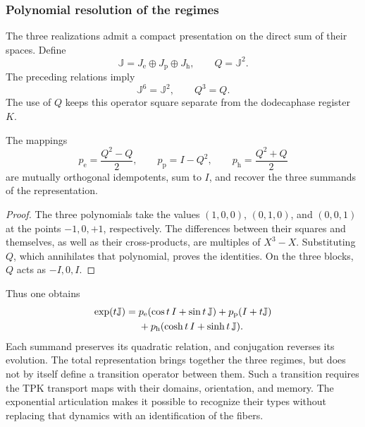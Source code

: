 \subsubsection{Polynomial resolution of the regimes}

The three realizations admit a compact presentation on the direct
sum of their spaces. Define
\[
 \mathbb J=J_{\mathrm e}\oplus J_{\mathrm p}\oplus J_{\mathrm h},
 \qquad Q=\mathbb J^2.
\]
The preceding relations imply
\[
 \mathbb J^6=\mathbb J^2,\qquad Q^3=Q.
\]
The use of \(Q\) keeps this operator square separate from the
dodecaphase register \(K\).

\begin{proposition}
\label{euler-trit-proyectores}
The mappings
\[
 p_{\mathrm e}=\frac{Q^2-Q}{2},\qquad
 p_{\mathrm p}=I-Q^2,\qquad
 p_{\mathrm h}=\frac{Q^2+Q}{2}
\]
are mutually orthogonal idempotents, sum to \(I\), and recover the three
summands of the representation.
\end{proposition}
\begin{proof}
The three polynomials take the values \((1,0,0)\), \((0,1,0)\), and
\((0,0,1)\) at the points \(-1,0,+1\), respectively. The differences
between their squares and themselves, as well as their cross-products, are
multiples of \(X^3-X\). Substituting \(Q\), which annihilates that polynomial, proves
the identities. On the three blocks, \(Q\) acts as \(-I,0,I\).
\end{proof}

Thus one obtains
\begin{align}
 \exp(t\mathbb J)
 ={}&p_{\mathrm e}(\cos t\,I+\sin t\,\mathbb J)
   +p_{\mathrm p}(I+t\mathbb J)\notag\\
   &+p_{\mathrm h}(\cosh t\,I+\sinh t\,\mathbb J).
 \label{euler-trit-exponencial-total}
\end{align}
Each summand preserves its quadratic relation, and conjugation reverses
its evolution. The total representation brings together the three regimes, but does not
by itself define a transition operator between them. Such a transition
requires the TPK transport maps with their domains, orientation, and
memory. The exponential articulation makes it possible to recognize their types without
replacing that dynamics with an identification of the fibers.
